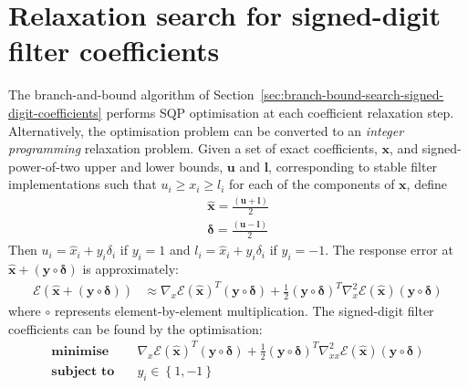 \documentclass[a4paper,twoside,10pt,english]{report}
\begin{document}
\section{\label{sec:relaxation-search-signed-digit-coefficients}Relaxation search for signed-digit filter coefficients}
The branch-and-bound algorithm of 
Section~\ref{sec:branch-bound-search-signed-digit-coefficients} performs
SQP optimisation at each coefficient relaxation step. Alternatively, the 
optimisation problem can be converted to an \emph{integer programming} 
relaxation problem. Given a set of exact coefficients, $\boldsymbol{x}$, and 
signed-power-of-two upper and lower bounds, $\boldsymbol{u}$ and 
$\boldsymbol{l}$, corresponding to stable filter implementations such that 
$u_{i} \ge x_{i} \ge l_{i}$ for each of the components of $\boldsymbol{x}$,
define
\begin{align*}
\boldsymbol{\hat{x}}=\frac{\left(\boldsymbol{u}+\boldsymbol{l}\right)}{2} \\
\boldsymbol{\delta}=\frac{\left(\boldsymbol{u}-\boldsymbol{l}\right)}{2}
\end{align*}
Then $u_{i}=\hat{x}_{i}+y_{i}\delta_{i}$ if $y_{i}=1$ and 
$l_{i}=\hat{x}_{i}+y_{i}\delta_{i}$ if $y_{i}=-1$. The response error at 
$\boldsymbol{\hat{x}}+\left(\boldsymbol{y}\circ\boldsymbol{\delta}\right)$ 
is approximately:
\begin{align*}
\mathcal{E}\left(\boldsymbol{\hat{x}}+
\left(\boldsymbol{y}\circ\boldsymbol{\delta}\right)\right)&\approx
\nabla_{x}\mathcal{E}\left(\boldsymbol{\hat{x}}\right)^{T}
\left(\boldsymbol{y}\circ\boldsymbol{\delta}\right) + 
\frac{1}{2}\left(\boldsymbol{y}\circ\boldsymbol{\delta}\right)^{T}
\nabla_{x}^{2}\mathcal{E}\left(\boldsymbol{\hat{x}}\right)
\left(\boldsymbol{y}\circ\boldsymbol{\delta}\right) 
\end{align*}
where $\circ$ represents element-by-element multiplication. The signed-digit 
filter coefficients can be found by the optimisation:
\begin{align}
\textbf{minimise}\quad&
\nabla_{x}\mathcal{E}\left(\boldsymbol{\hat{x}}\right)^{T}
\left(\boldsymbol{y}\circ\boldsymbol{\delta}\right) + 
\frac{1}{2}\left(\boldsymbol{y}\circ\boldsymbol{\delta}\right)^{T}
\nabla_{xx}^{2}\mathcal{E}\left(\boldsymbol{\hat{x}}\right)
\left(\boldsymbol{y}\circ\boldsymbol{\delta}\right)\\
\textbf{subject to}\quad&y_{i}\in\left\{1,-1\right\}
\label{eqn:integer-programming-coefficient-truncation}
\end{align}
\end{document}
